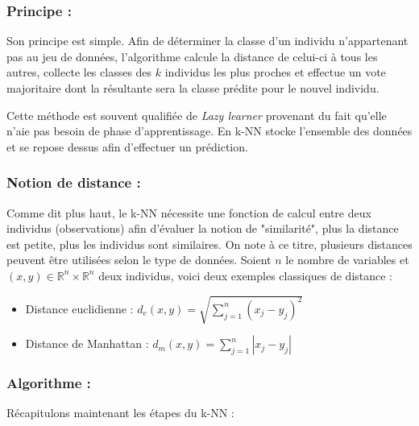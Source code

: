 \documentclass[11pt]{article}
\begin{document}
\subsubsection{Principe :}


Son principe est simple. Afin de déterminer la classe d'un individu n'appartenant pas au jeu de données, l'algorithme calcule la distance de celui-ci à tous les autres, collecte les classes des $k$ individus les plus proches et effectue un vote majoritaire dont la résultante sera la classe prédite pour le nouvel individu.\par
Cette méthode est souvent qualifiée de \textit{Lazy learner} provenant du fait qu'elle n'aie pas besoin de phase d'apprentissage.
En k-NN stocke l'ensemble des données et se repose dessus afin d'effectuer un prédiction.\par


\subsubsection{Notion de distance :}

Comme dit plus haut, le k-NN nécessite une fonction de calcul entre deux individus (observations) afin d'évaluer la notion de "similarité", plus la distance est petite, plus les individus sont similaires.
On note à ce titre, plusieurs distances peuvent être utilisées selon le type de données. Soient $n$  le nombre de variables et $(x,y) \in \mathbb{R}^{n} \times \mathbb{R}^{n}$ deux individus, voici deux exemples classiques de distance :
    \begin{itemize}
    \renewcommand{\labelitemii}{-}
        \item Distance euclidienne : $d_{e}(x,y)=\sqrt{\sum_{j=1}^{n}\left(x_{j}-y_{j}\right)^{2}}$

        \item Distance de Manhattan : $d_{m}(x,y)=\sum_{j=1}^{n}\left|x_{j}-y_{j}\right|$
    \end{itemize}

\subsubsection{Algorithme :}
Récapitulons maintenant les étapes du k-NN :
\end{document}
